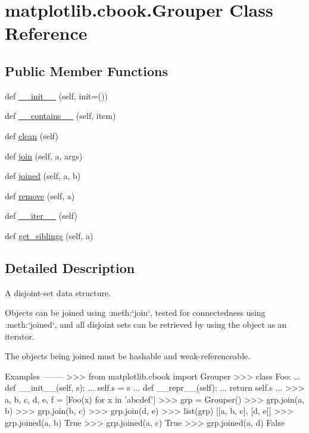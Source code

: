 \hypertarget{classmatplotlib_1_1cbook_1_1Grouper}{}\section{matplotlib.\+cbook.\+Grouper Class Reference}
\label{classmatplotlib_1_1cbook_1_1Grouper}
\subsection*{Public Member Functions}
\begin{DoxyCompactItemize}
\item 
def \hyperlink{classmatplotlib_1_1cbook_1_1Grouper_a8fd0717b9292b4a144174c8947f30259}{\+\_\+\+\_\+init\+\_\+\+\_\+} (self, init=())
\item 
def \hyperlink{classmatplotlib_1_1cbook_1_1Grouper_aebdecec3f4b2e8ffbc4a906de25dd5f6}{\+\_\+\+\_\+contains\+\_\+\+\_\+} (self, item)
\item 
def \hyperlink{classmatplotlib_1_1cbook_1_1Grouper_aa5bf741cc3dfca7bf6b26cc0b7e42385}{clean} (self)
\item 
def \hyperlink{classmatplotlib_1_1cbook_1_1Grouper_a4bf36936f9e0646e98fa5e53c0ee8a74}{join} (self, a, args)
\item 
def \hyperlink{classmatplotlib_1_1cbook_1_1Grouper_ad16464cb2d394ad2bc6d107127367e50}{joined} (self, a, b)
\item 
def \hyperlink{classmatplotlib_1_1cbook_1_1Grouper_a4901edd86efb4044eb7c56ab785caa9a}{remove} (self, a)
\item 
def \hyperlink{classmatplotlib_1_1cbook_1_1Grouper_abab1aeb7aeaed8d6361220568de94080}{\+\_\+\+\_\+iter\+\_\+\+\_\+} (self)
\item 
def \hyperlink{classmatplotlib_1_1cbook_1_1Grouper_abd75a901fdc68bb20dbd5c2cba15c880}{get\+\_\+siblings} (self, a)
\end{DoxyCompactItemize}


\subsection{Detailed Description}
\begin{DoxyVerb}A disjoint-set data structure.

Objects can be joined using :meth:`join`, tested for connectedness
using :meth:`joined`, and all disjoint sets can be retrieved by
using the object as an iterator.

The objects being joined must be hashable and weak-referenceable.

Examples
--------
>>> from matplotlib.cbook import Grouper
>>> class Foo:
...     def __init__(self, s):
...         self.s = s
...     def __repr__(self):
...         return self.s
...
>>> a, b, c, d, e, f = [Foo(x) for x in 'abcdef']
>>> grp = Grouper()
>>> grp.join(a, b)
>>> grp.join(b, c)
>>> grp.join(d, e)
>>> list(grp)
[[a, b, c], [d, e]]
>>> grp.joined(a, b)
True
>>> grp.joined(a, c)
True
>>> grp.joined(a, d)
False
\end{DoxyVerb}
 

